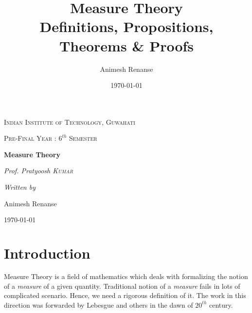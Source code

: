 \documentclass{article}
\title{\Huge Measure Theory\\
	\Large Definitions, Propositions, Theorems \& Proofs}
\author{Animesh Renanse}
\date{\today}
\theoremstyle{definition}
\theoremstyle{remark}
\theoremstyle{definition}
\theoremstyle{definition}
\theoremstyle{definition}
\begin{document}
\begin{titlepage}
	{\scshape\LARGE Indian Institute of Technology, Guwahati \par}
	\vspace{1cm}
	{\scshape\Large Pre-Final Year : $ 6^{th} $ Semester\par}
	\vspace{1.5cm}
	{\Huge\bfseries Measure Theory\par}
	\vspace{2cm}
	{\Large\itshape Prof. Pratyoosh \textsc{Kumar}\par}
	\vfill
	\emph{Written by}\par
	Animesh Renanse
	
	\vfill
	
	{\large \today\par}
\end{titlepage}
\tableofcontents
\newpage
\section{Introduction}
Measure Theory is a field of mathematics which deals with formalizing the notion of a \emph{measure} of a given quantity. Traditional notion of a \emph{measure} fails in lots of complicated scenario. Hence, we need a rigorous definition of it. The work in this direction was forwarded by Lebesgue and others in the dawn of $ 20^{th} $ century.
\end{document}
